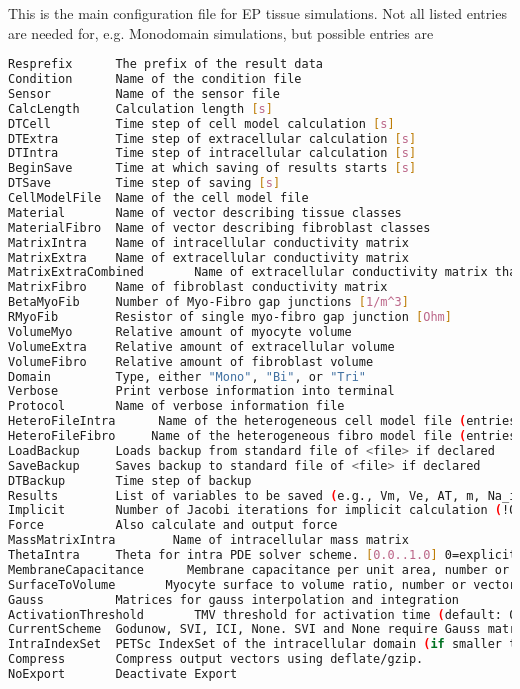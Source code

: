 This is the main configuration file for EP tissue simulations.
Not all listed entries are needed for, e.g. Monodomain simulations, but possible entries are
\begin{lstlisting}[language=Bash,caption=acCELLerate configuration file (*.aclt)]
Resprefix      The prefix of the result data
Condition      Name of the condition file 
Sensor         Name of the sensor file 
CalcLength     Calculation length [s]
DTCell         Time step of cell model calculation [s]
DTExtra        Time step of extracellular calculation [s]
DTIntra        Time step of intracellular calculation [s]
BeginSave      Time at which saving of results starts [s]
DTSave         Time step of saving [s]
CellModelFile  Name of the cell model file
Material       Name of vector describing tissue classes
MaterialFibro  Name of vector describing fibroblast classes
MatrixIntra    Name of intracellular conductivity matrix
MatrixExtra    Name of extracellular conductivity matrix
MatrixExtraCombined       Name of extracellular conductivity matrix that is already combined with Intra (and Fibro)
MatrixFibro    Name of fibroblast conductivity matrix
BetaMyoFib     Number of Myo-Fibro gap junctions [1/m^3]
RMyoFib        Resistor of single myo-fibro gap junction [Ohm]
VolumeMyo      Relative amount of myocyte volume
VolumeExtra    Relative amount of extracellular volume
VolumeFibro    Relative amount of fibroblast volume
Domain         Type, either "Mono", "Bi", or "Tri"
Verbose        Print verbose information into terminal
Protocol       Name of verbose information file
HeteroFileIntra      Name of the heterogeneous cell model file (entries: <vector file name> <parameter name>)
HeteroFileFibro     Name of the heterogeneous fibro model file (entries: <vector file name> <parameter name>)
LoadBackup     Loads backup from standard file of <file> if declared
SaveBackup     Saves backup to standard file of <file> if declared
DTBackup       Time step of backup
Results        List of variables to be saved (e.g., Vm, Ve, AT, m, Na_i, I_Na, and any variable of the cell model)
Implicit       Number of Jacobi iterations for implicit calculation (!Only for Monodomain)
Force          Also calculate and output force
MassMatrixIntra        Name of intracellular mass matrix
ThetaIntra     Theta for intra PDE solver scheme. [0.0..1.0] 0=explicit, 1=implicit (default: 0 (FD) or 0.5 (FE))
MembraneCapacitance      Membrane capacitance per unit area, number or vector (F/m^2)
SurfaceToVolume       Myocyte surface to volume ratio, number or vector (1/m, default: cell model)
Gauss          Matrices for gauss interpolation and integration
ActivationThreshold       TMV threshold for activation time (default: 0V).
CurrentScheme  Godunow, SVI, ICI, None. SVI and None require Gauss matrices.
IntraIndexSet  PETSc IndexSet of the intracellular domain (if smaller than the xtracellular domain)
Compress       Compress output vectors using deflate/gzip.
NoExport       Deactivate Export
\end{lstlisting}

